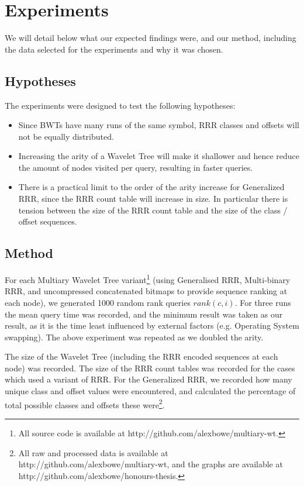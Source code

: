 \section{Experiments}
\label{sec:experiments}

We will detail below what our expected findings were, and our method, including 
the data selected for the experiments and why it was chosen.

\subsection{Hypotheses}
The experiments were designed to test the following hypotheses:

\begin{itemize}
    \item 	
			Since BWTs have many runs of the same symbol, RRR classes and 
			offsets will not be equally distributed.

    \item 	
			Increasing the arity of a Wavelet Tree will make it shallower and
		   	hence reduce the amount of nodes visited per query, resulting
		   	in faster queries.
			
    \item  
			There is a practical limit to the order of the arity increase for 
		   	Generalized RRR, since the RRR count table will increase in size. In
			particular there is tension between the size of the RRR 
			count table and the size of the class / offset sequences.
\end{itemize}

\subsection{Method}
For each Multiary Wavelet Tree variant\footnote{All source code is available at 
http://github.com/alexbowe/multiary-wt.} (using Generalised RRR, Multi-binary
RRR, and uncompressed concatenated bitmaps to provide
sequence ranking at each node), we generated 1000 
random rank queries $rank(c, i)$. For three runs the mean query time was 
recorded, and the minimum result was taken as our result, as it is the time 
least influenced by external factors (e.g. Operating System swapping). The above
experiment was repeated as we doubled the arity.

The size of  the Wavelet Tree (including the RRR encoded sequences at each node) 
was recorded. The size of the RRR count tables was recorded for the cases which 
used a variant of RRR. For the Generalized RRR, we recorded how many unique 
class and offset values were encountered, and calculated the percentage of total 
possible 
classes and offsets these were\footnote{All raw and processed data is 
available at http://github.com/alexbowe/multiary-wt, and the graphs are 
available at http://github.com/alexbowe/honours-thesis.}.

